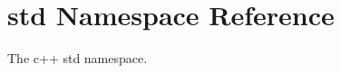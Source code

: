 \hypertarget{namespacestd}{}\section{std Namespace Reference}
\label{namespacestd}


The c++ std namespace.  


